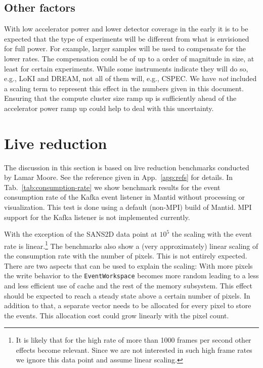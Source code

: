 \documentclass[a4paper,english,numbers=noenddot,bibliography=totoc,chapterprefix=on,DIV=12]{scrartcl}
\newcommand{\cspec}{CSPEC\xspace}
\newcommand{\dream}{DREAM\xspace}
\newcommand{\loki}{LoKI\xspace}
\newcommand{\mantid}{Mantid\xspace}
\begin{document}
\subsection{Other factors}

With low accelerator power and lower detector coverage in the early it is to be expected that the type of experiments will be different from what is envisioned for full power.
For example, larger samples will be used to compensate for the lower rates.
The compensation could be of up to a order of magnitude in size, at least for certain experiments.
While some instruments indicate they will do so, e.g., \loki and \dream, not all of them will, e.g., \cspec.
We have \emph{not} included a scaling term to represent this effect in the numbers given in this document.
Ensuring that the compute cluster size ramp up is sufficiently ahead of the accelerator power ramp up could help to deal with this uncertainty.

\section{Live reduction}

The discussion in this section is based on live reduction benchmarks conducted by Lamar Moore.
See the reference given in App.~\ref{app:refs} for details.
In Tab.~\ref{tab:consumption-rate} we show benchmark results for the event consumption rate of the Kafka event listener in \mantid without processing or visualization.
This test is done using a default (non-MPI) build of \mantid.
MPI support for the Kafka listener is not implemented currently.

With the exception of the SANS2D data point at $10^5$ the scaling with the event rate is linear.\footnote{It is likely that for the high rate of more than 1000 frames per second other effects become relevant. Since we are not interested in such high frame rates we ignore this data point and assume linear scaling.}
The benchmarks also show a (very approximately) linear scaling of the consumption rate with the number of pixels.
This is not entirely expected.
There are two aspects that can be used to explain the scaling:
With more pixels the write behavior to the \verb|EventWorkspace| becomes more random leading to a less and less efficient use of cache and the rest of the memory subsystem.
This effect should be expected to reach a steady state above a certain number of pixels.
In addition to that, a separate vector needs to be allocated for every pixel to store the events.
This allocation cost could grow linearly with the pixel count.
\end{document}
